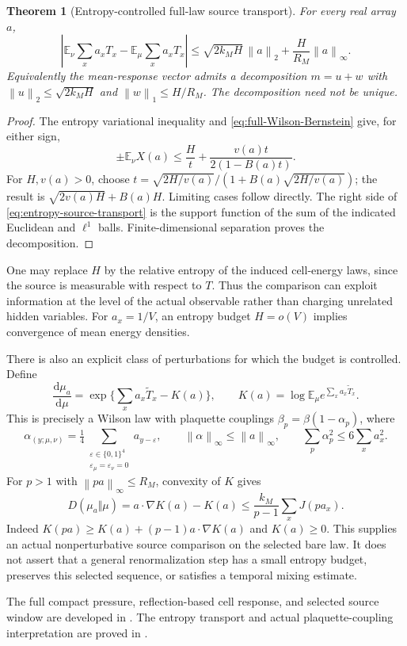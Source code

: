 \documentclass[11pt,oneside,openany]{book}
\newtheorem{theorem}{Theorem}[chapter]
\theoremstyle{definition}
\theoremstyle{remark}
\newcommand{\E}{\mathbb E}
\newcommand{\dd}{\mathrm d}
\newcommand{\norm}[1]{\left\lVert#1\right\rVert}
\newcommand{\src}[2]{\cite[#2]{#1}}
\newcommand{\sourcebasis}[1]{\par\smallskip\noindent #1\par}
\begin{document}
\begin{theorem}[Entropy-controlled full-law source transport]
\label{thm:entropy-source-transport}
For every real array $a$,
\begin{equation}
 \left|\E_\nu\sum_xa_xT_x-\E_\mu\sum_xa_xT_x\right|
 \le\sqrt{2k_MH}\,\norm{a}_2
                         +\frac H{R_M}\norm{a}_\infty.
 \label{eq:entropy-source-transport}
\end{equation}
Equivalently the mean-response vector admits a decomposition
$m=u+w$ with $\norm{u}_2\le\sqrt{2k_MH}$ and
$\norm{w}_1\le H/R_M$. The decomposition need not be unique.
\end{theorem}
\begin{proof}
The entropy variational inequality and
\cref{eq:full-Wilson-Bernstein} give, for either sign,
\[
 \pm\E_\nu X(a)\le\frac Ht+
                         \frac{v(a)t}{2(1-B(a)t)}.
\]
For $H,v(a)>0$, choose
$t=\sqrt{2H/v(a)}/(1+B(a)\sqrt{2H/v(a)})$; the result is
$\sqrt{2v(a)H}+B(a)H$. Limiting cases follow directly.
The right side of \cref{eq:entropy-source-transport} is the support
function of the sum of the indicated Euclidean and $\ell^1$ balls.
Finite-dimensional separation proves the decomposition.
\end{proof}
One may replace $H$ by the relative entropy of the induced cell-energy
laws, since the source is measurable with respect to $T$. Thus the
comparison can exploit information at the level of the actual
observable rather than charging unrelated hidden variables. For
$a_x=1/V$, an entropy budget $H=o(V)$ implies convergence of mean
energy densities.

There is also an explicit class of perturbations for which the budget
is controlled. Define
\[
 \frac{\dd\mu_a}{\dd\mu}
   =\exp\{\sum_xa_x\widetilde T_x-K(a)\},\qquad
 K(a)=\log\E_\mu e^{\sum_xa_x\widetilde T_x}.
\]
This is precisely a Wilson law with plaquette couplings
$\beta_p=\beta(1-\alpha_p)$, where
\[
 \alpha_{(y;\mu,\nu)}
  =\tfrac14\sum_{\substack{\varepsilon\in\{0,1\}^4\\
                 \varepsilon_\mu=\varepsilon_\nu=0}}a_{y-\varepsilon},
 \qquad \norm{\alpha}_\infty\le\norm a_\infty,
 \qquad \sum_p\alpha_p^2\le6\sum_xa_x^2.
\]
For $p>1$ with $\norm{pa}_\infty\le R_M$, convexity of $K$ gives
\begin{equation}
 D(\mu_a\Vert\mu)=a\cdot\nabla K(a)-K(a)
       \le\frac{k_M}{p-1}\sum_xJ(pa_x).
 \label{eq:Wilson-tilt-entropy}
\end{equation}
Indeed $K(pa)\ge K(a)+(p-1)a\cdot\nabla K(a)$ and $K(a)\ge0$.
This supplies an actual nonperturbative source comparison on the
selected bare law. It does not assert that a general renormalization
step has a small entropy budget, preserves this selected sequence,
or satisfies a temporal mixing estimate.
\sourcebasis{The full compact pressure, reflection-based cell response,
and selected source window are developed in \src{F14}{V95--V100}.
The entropy transport and actual plaquette-coupling interpretation are
proved in \src{F15}{V1--V2}.}
\end{document}

